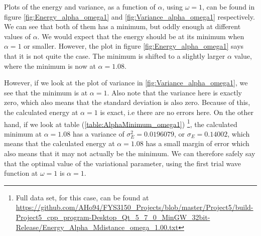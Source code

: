 \documentclass[12pt]{article}
\begin{document}
Plots of the energy and variance, as a function of $\alpha$, using $\omega = 1$, can be found in figure \ref{fig:Energy_alpha_omega1} and \ref{fig:Variance_alpha_omega1} respectively. We can see that both of them has a minimum, but oddly enough at different values of $\alpha$. We would expect that the energy should be at its minimum when $\alpha = 1$ or smaller. However, the plot in figure \ref{fig:Energy_alpha_omega1} says that it is not quite the case. The minimum is shifted to a slightly larger $\alpha$ value, where the minimum is now at $\alpha = 1.08$.

However, if we look at the plot of variance in \ref{fig:Variance_alpha_omega1}, we see that the minimum is at $\alpha = 1$. Also note that the variance here is exactly zero, which also means that the standard deviation is also zero. Because of this, the calculated energy at $\alpha = 1$ is exact, i.e there are no errors here. On the other hand, if we look at table (\ref{table:AlphaMinimum_omega1}) \footnote{Full data set, for this case, can be found at \url{https://github.com/AHo94/FYS3150_Projects/blob/master/Project5/build-Project5_cpp_program-Desktop_Qt_5_7_0_MinGW_32bit-Release/Energy_Alpha_Mdistance_omega_1.00.txt}}, the calculated minimum at $\alpha=1.08$ has a variance of $\sigma_E^2 = 0.0196079$, or $\sigma_E = 0.14002$, which means that the calculated energy at $\alpha = 1.08$ has a small margin of error which also means that it may not actually be the minimum. We can therefore safely say that the optimal value of the variational parameter, using the first trial wave function at $\omega = 1$ is $\alpha = 1$.
\end{document}
